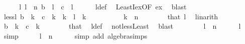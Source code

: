 \begin{isabellebody}
\ \ \isamarkupfalse%
\ \isamarkupfalse%
\ l{\isacharcolon}{\kern0pt}\ {\isachardoublequoteopen}l\ {\isacharless}{\kern0pt}\ n{\isachardoublequoteclose}\ {\isachardoublequoteopen}b\ {\isacharbang}{\kern0pt}\ l\ {\isasymnoteq}\ c\ {\isacharbang}{\kern0pt}\ l{\isachardoublequoteclose}\isanewline
\ \ \ \ \isamarkupfalse%
\ l{\isacharunderscore}{\kern0pt}def\ \isamarkupfalse%
\ LeastI{\isacharunderscore}{\kern0pt}ex{\isacharbrackleft}{\kern0pt}OF\ ex{\isacharbrackright}{\kern0pt}\ \isamarkupfalse%
\ blast{\isacharplus}{\kern0pt}\isanewline
\ \ \isamarkupfalse%
\ less{\isacharunderscore}{\kern0pt}l{\isacharcolon}{\kern0pt}\ {\isachardoublequoteopen}b\ {\isacharbang}{\kern0pt}\ k\ {\isacharequal}{\kern0pt}\ c\ {\isacharbang}{\kern0pt}\ k{\isachardoublequoteclose}\ \ {\isacartoucheopen}k\ {\isacharless}{\kern0pt}\ l{\isacartoucheclose}\ \ k\isanewline
\ \ \isamarkupfalse%
\ {\isacharminus}{\kern0pt}\isanewline
\ \ \ \ \isamarkupfalse%
\ {\isachardoublequoteopen}k\ {\isacharless}{\kern0pt}\ n{\isachardoublequoteclose}\isanewline
\ \ \ \ \ \ \isamarkupfalse%
\ that\ l\ \isamarkupfalse%
\ linarith\isanewline
\ \ \ \ \isamarkupfalse%
\ \isamarkupfalse%
\ {\isachardoublequoteopen}b\ {\isacharbang}{\kern0pt}\ k\ {\isacharequal}{\kern0pt}\ c\ {\isacharbang}{\kern0pt}\ k{\isachardoublequoteclose}\isanewline
\ \ \ \ \ \ \isamarkupfalse%
\ that\ \isamarkupfalse%
\ l{\isacharunderscore}{\kern0pt}def\ \isamarkupfalse%
\ not{\isacharunderscore}{\kern0pt}less{\isacharunderscore}{\kern0pt}Least\ \isamarkupfalse%
\ blast\isanewline
\ \ \isamarkupfalse%
\isanewline
\ \ \isamarkupfalse%
\ \isamarkupfalse%
\ {\isachardoublequoteopen}l\ {\isasymin}\ {\isacharbraceleft}{\kern0pt}{}{\isachardot}{\kern0pt}{\isachardot}{\kern0pt}n{\isacharminus}{\kern0pt}{}{\isacharbraceright}{\kern0pt}{\isachardoublequoteclose}\isanewline
\ \ \ \ \isamarkupfalse%
\ l\ \isamarkupfalse%
\ simp\isanewline
\ \ \isamarkupfalse%
\ \isamarkupfalse%
\ {\isachardoublequoteopen}l\ {\isacharless}{\kern0pt}\ n{\isachardoublequoteclose}\isanewline
\ \ \ \ \isamarkupfalse%
\ {\isacharparenleft}{\kern0pt}simp\ add{\isacharcolon}{\kern0pt}\ algebra{\isacharunderscore}{\kern0pt}simps{\isacharparenright}{\kern0pt}\isanewline

\end{isabellebody}
